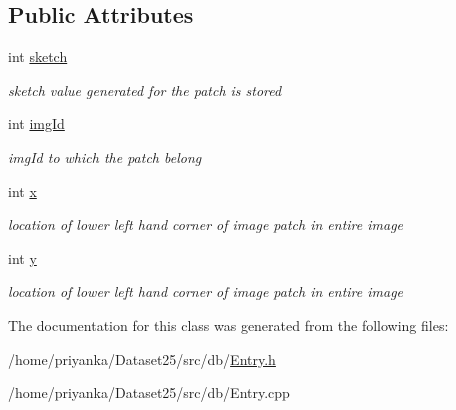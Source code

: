 \subsection*{\-Public \-Attributes}
\begin{DoxyCompactItemize}
\item 
\hypertarget{classEntry_afde1f6b07cee7ad7631478331fe408d1}{int \hyperlink{classEntry_afde1f6b07cee7ad7631478331fe408d1}{sketch}}\label{classEntry_afde1f6b07cee7ad7631478331fe408d1}

\begin{DoxyCompactList}\small\item\em sketch value generated for the patch is stored \end{DoxyCompactList}\item 
\hypertarget{classEntry_a737aa8df82530d927377e9c5e9bb9fae}{int \hyperlink{classEntry_a737aa8df82530d927377e9c5e9bb9fae}{img\-Id}}\label{classEntry_a737aa8df82530d927377e9c5e9bb9fae}

\begin{DoxyCompactList}\small\item\em img\-Id to which the patch belong \end{DoxyCompactList}\item 
\hypertarget{classEntry_a4d5d860d6b330e58c75cade1ada74881}{int \hyperlink{classEntry_a4d5d860d6b330e58c75cade1ada74881}{x}}\label{classEntry_a4d5d860d6b330e58c75cade1ada74881}

\begin{DoxyCompactList}\small\item\em location of lower left hand corner of image patch in entire image \end{DoxyCompactList}\item 
\hypertarget{classEntry_aab8ab2b5e5357e38214b97b3dabd3856}{int \hyperlink{classEntry_aab8ab2b5e5357e38214b97b3dabd3856}{y}}\label{classEntry_aab8ab2b5e5357e38214b97b3dabd3856}

\begin{DoxyCompactList}\small\item\em location of lower left hand corner of image patch in entire image \end{DoxyCompactList}\end{DoxyCompactItemize}


\-The documentation for this class was generated from the following files\-:\begin{DoxyCompactItemize}
\item 
/home/priyanka/\-Dataset25/src/db/\hyperlink{Entry_8h}{\-Entry.\-h}\item 
/home/priyanka/\-Dataset25/src/db/\-Entry.\-cpp\end{DoxyCompactItemize}
